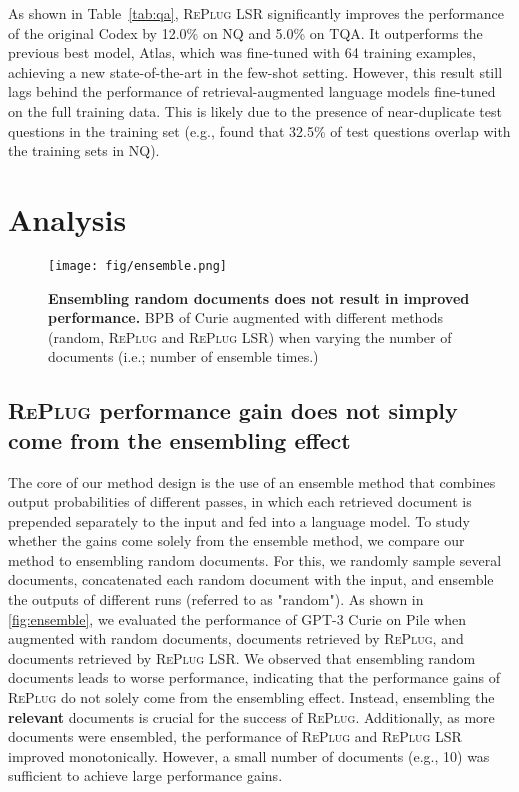 \documentclass[nohyperref]{article}
\newcommand{\model}{\textsc{RePlug}\xspace}
\newcommand{\tunemodel}{\textsc{RePlug LSR}\xspace}
\theoremstyle{plain}
\theoremstyle{definition}
\theoremstyle{remark}
\begin{document}
As shown in Table~\ref{tab:qa}, \tunemodel significantly improves the performance of the original Codex by 12.0\% on NQ and 5.0\% on TQA. It outperforms the previous best model, Atlas, which was fine-tuned with 64 training examples, achieving a new state-of-the-art in the few-shot setting. However, this result still lags behind the performance of retrieval-augmented language models fine-tuned on the full training data. This is likely due to the presence of near-duplicate test questions in the training set (e.g., \citet{lewis2021question} found that 32.5\% of test questions overlap with the training sets in NQ). 














 \section{Analysis}

\begin{figure}[]
\centering 
\texttt{[image: fig/ensemble.png]}
\caption{
\textbf{Ensembling random documents does not result in improved performance.} BPB of Curie augmented with different methods (random, \model and \tunemodel) when varying the number of documents (i.e.; number of ensemble times.)}  
\label{fig:ensemble}
\end{figure}




\subsection{\model performance gain does not simply come from the ensembling effect
}


The core of our method design is the use of an ensemble method that combines output probabilities of different passes, in which each retrieved document is prepended separately to the input and fed into a language model. To study whether the gains come solely from the ensemble method, we compare our method to ensembling random documents. For this, we randomly sample several documents, concatenated each random document with the input, and ensemble the outputs of different runs (referred to as "random").
As shown in \autoref{fig:ensemble}, we evaluated the performance of GPT-3 Curie on Pile when augmented with random documents, documents retrieved by \model, and documents retrieved by \tunemodel. We observed that ensembling random documents leads to worse performance, indicating that the performance gains of \model do not solely come from the ensembling effect. Instead, ensembling the \textbf{relevant} documents is crucial for the success of \model. Additionally, as more documents were ensembled, the performance of \model and \tunemodel improved monotonically. However, a small number of documents (e.g., 10) was sufficient to achieve large performance gains.
\end{document}
